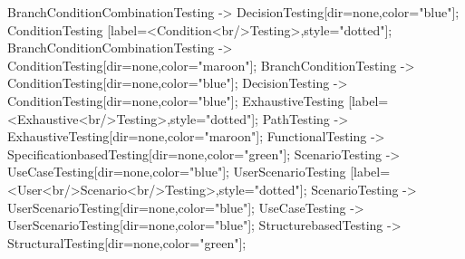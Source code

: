 \documentclass{article}
\begin{document}
{BranchConditionCombinationTesting -> DecisionTesting[dir=none,color="blue"];
ConditionTesting [label=<Condition<br/>Testing>,style="dotted"];
BranchConditionCombinationTesting -> ConditionTesting[dir=none,color="maroon"];
BranchConditionTesting -> ConditionTesting[dir=none,color="blue"];
DecisionTesting -> ConditionTesting[dir=none,color="blue"];
ExhaustiveTesting [label=<Exhaustive<br/>Testing>,style="dotted"];
PathTesting -> ExhaustiveTesting[dir=none,color="maroon"];
FunctionalTesting -> SpecificationbasedTesting[dir=none,color="green"];
ScenarioTesting -> UseCaseTesting[dir=none,color="blue"];
UserScenarioTesting [label=<User<br/>Scenario<br/>Testing>,style="dotted"];
ScenarioTesting -> UserScenarioTesting[dir=none,color="blue"];
UseCaseTesting -> UserScenarioTesting[dir=none,color="blue"];
StructurebasedTesting -> StructuralTesting[dir=none,color="green"];

}
\end{document}
